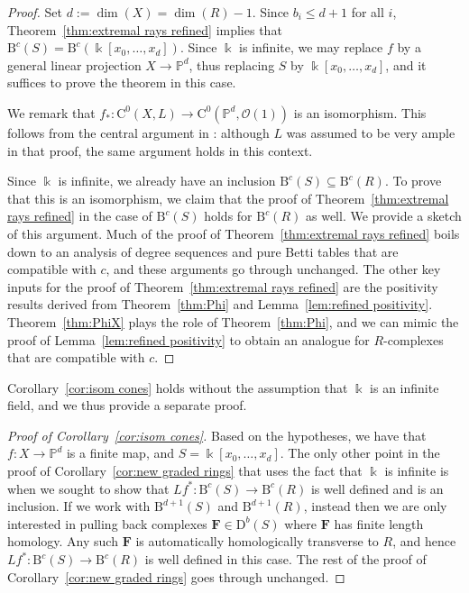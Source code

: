 \documentclass[12pt]{amsart}
\theoremstyle{definition}
\theoremstyle{remark}
\newcommand{\kk}{\Bbbk}
\newcommand{\PP}{\mathbb{P}}
\newcommand{\cc}{c}
\newcommand{\cO}{\mathcal{O}}
\newcommand{\cE}{\mathcal{E}}
\newcommand{\cU}{\mathcal{U}}
\newcommand{\FF}{\mathbf{F}}
\newcommand{\DD}{\mathrm{D}}
\newcommand{\CQ}{\mathrm{C}}
\newcommand{\BBQ}{\mathrm{B}}
\begin{document}
\begin{proof}%
Set $d:=\dim(X)=\dim(R)-1$.  Since $b_i\leq d+1$ for all $i$, Theorem~\ref{thm:extremal rays refined} implies that $\BBQ^{\cc}(S)=\BBQ^{\cc}(\kk[x_0,\dots,x_d]).$  Since $\kk$ is infinite, we may replace $f$ by a general linear projection $X\to \PP^d$, thus replacing $S$ by $\kk[x_0,\dots,x_d]$, and it suffices to prove the theorem in this case.

We remark that $f_*\colon \CQ^0(X,L)\to \CQ^{0}(\PP^d, \cO(1))$  is an isomorphism.  This follows from the central argument in
\cite[Proof of Theorem 5]{eis-schrey-abel}: although $L$ was assumed to be very ample in that proof, the same argument
holds in this context.

Since $\kk$ is infinite, we already have an inclusion $\BBQ^{\cc}(S)\subseteq \BBQ^{\cc}(R)$.  To prove that this is an isomorphism, we claim that the proof of Theorem~\ref{thm:extremal rays refined} in the case of $\BBQ^{\cc}(S)$ holds for $\BBQ^{\cc}(R)$ as well.  We provide a sketch of this argument.  Much of the proof of Theorem~\ref{thm:extremal rays refined} boils down to an analysis of degree sequences and pure Betti tables that are compatible with $\cc$, and these arguments go through unchanged.  The other key inputs for the proof of Theorem~\ref{thm:extremal rays refined} are the positivity results derived from Theorem~\ref{thm:Phi} and Lemma~\ref{lem:refined positivity}.  Theorem~\ref{thm:PhiX} plays the role of Theorem~\ref{thm:Phi}, and we can mimic the proof of Lemma~\ref{lem:refined positivity} to obtain an analogue for $R$-complexes that are compatible with $\cc$.  
\end{proof}

Corollary~\ref{cor:isom cones} holds without the assumption that $\kk$ is an infinite field, and we thus provide a separate proof.
\begin{proof}[Proof of Corollary~\ref{cor:isom cones}]
Based on the hypotheses, we have that $f\colon X\to \PP^d$ is a finite map, and $S=\kk[x_0, \dots, x_d]$.  The only other point in the proof of Corollary~\ref{cor:new graded rings} that uses the fact that $\kk$ is infinite is when we sought to show that $Lf^*: \BBQ^{\cc}(S)\to \BBQ^{\cc}(R)$ is well defined and is an inclusion.  If we work with $\BBQ^{d+1}(S)$ and $\BBQ^{d+1}(R)$, instead then we are only interested in pulling back complexes $\FF\in \DD^b(S)$ where $\FF$ has finite length homology.  Any such $\FF$ is automatically homologically transverse to $R$, and hence $Lf^*: \BBQ^{\cc}(S)\to \BBQ^{\cc}(R)$ is well defined in this case.  The rest of the proof of Corollary~\ref{cor:new graded rings} goes through unchanged.
\end{proof}
\end{document}
